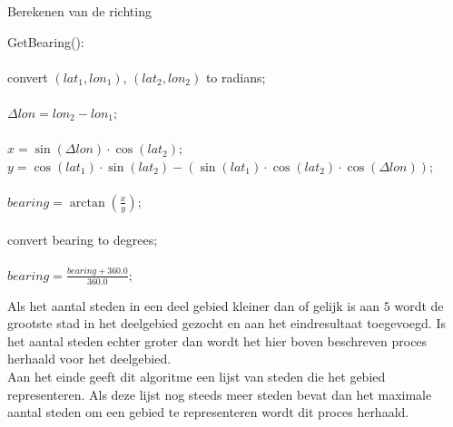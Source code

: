 \documentclass[twoside,openright]{uva-bachelor-thesis}
\begin{document}
			\begin{algorithm}
				\caption{Berekenen van de richting}
				\label{alg:bearing}
				\mbox{GetBearing():}\\[0.5cm]
				\mbox{}\\
				convert $(lat_1, lon_1)$, $(lat_2, lon_2)$ to radians;\\
				\mbox{}\\
				$\Delta lon = lon_2 - lon_1;$\\
				\mbox{}\\
				$x = \sin(\Delta lon) \cdot \cos(lat_2);$\\
				$y = \cos(lat_1) \cdot \sin(lat_2) - (\sin(lat_1) \cdot \cos(lat_2) \cdot \cos(\Delta lon));$\\
				\mbox{}\\
				$bearing = \arctan(\frac{x}{y});$\\
				\mbox{}\\
				convert bearing to degrees;\\
				\mbox{}\\
				$bearing = \frac{bearing + 360.0}{360.0};$\\
			\end{algorithm}
			Als het aantal steden in een deel gebied kleiner dan of gelijk is aan $5$ wordt de grootste stad in het deelgebied gezocht en aan het eindresultaat toegevoegd. Is het aantal steden echter groter dan wordt het hier boven beschreven proces herhaald voor het deelgebied. \\[0.5cm]
			Aan het einde geeft dit algoritme een lijst van steden die het gebied representeren. Als deze lijst nog steeds meer steden bevat dan het maximale aantal steden om een gebied te representeren wordt dit proces herhaald.
\end{document}
